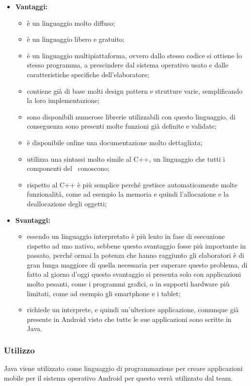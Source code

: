 	\begin{itemize}
		\item \textbf{Vantaggi:}
			\begin{itemize}
				\item è un linguaggio molto diffuso;
				\item è un linguaggio libero e gratuito; %
				\item è un linguaggio multipiattaforma, ovvero dallo stesso codice si ottiene lo stesso programma, a prescindere dal sistema operativo usato e dalle caratteristiche specifiche dell'elaboratore;
				\item contiene già di base molti design pattern e strutture varie, semplificando la loro implementazione;
				\item sono disponibili numerose librerie utilizzabili con questo linguaggio, di conseguenza sono presenti molte funzioni già definite e validate;
				\item è disponibile online una documentazione molto dettagliata;
				\item utilizza una sintassi molto simile al C++, un linguaggio che tutti i componenti del \ conoscono;
				\item rispetto al C++ è più semplice perché gestisce automaticamente molte funzionalità, come ad esempio la memoria e quindi l'allocazione e la deallocazione degli oggetti;
			\end{itemize}
		\item \textbf{Svantaggi:}
			\begin{itemize}
				\item essendo un linguaggio interpretato è più lento in fase di esecuzione rispetto ad uno nativo, sebbene questo svantaggio fosse più importante in passato, perché ormai la potenza che hanno raggiunto gli elaboratori è di gran lunga maggiore di quella necessaria per superare questo problema, di fatto al giorno d'oggi questo svantaggio si presenta solo con applicazioni molto pesanti, come i programmi grafici, o in supporti hardware più limitati, come ad esempio gli smartphone e i tablet;
				\item richiede un interprete, e quindi un'ulteriore applicazione, comunque già presente in Android visto che tutte le sue applicazioni sono scritte in Java.
			\end{itemize}
	\end{itemize}
	\subsubsection{Utilizzo}
	Java viene utilizzato come linguaggio di programmazione per creare applicazioni mobile per il sistema operativo Android per questo verrà utilizzato dal team.

